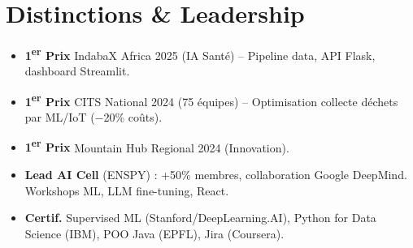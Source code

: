 \documentclass[a4paper,11pt]{article}
\begin{document}
\section{Distinctions \& Leadership}
\begin{itemize}[leftmargin=*, label=\tiny$\bullet$, nosep]
    \item \small{\textbf{1\textsuperscript{er} Prix} IndabaX Africa 2025 (IA Santé) -- Pipeline data, API Flask, dashboard Streamlit.}
    \item \small{\textbf{1\textsuperscript{er} Prix} CITS National 2024 (75 équipes) -- Optimisation collecte déchets par ML/IoT ($-$20\% coûts).}
    \item \small{\textbf{1\textsuperscript{er} Prix} Mountain Hub Regional 2024 (Innovation).}
    \item \small{\textbf{Lead AI Cell} (ENSPY) : +50\% membres, collaboration Google DeepMind. Workshops ML, LLM fine-tuning, React.}
    \item \small{\textbf{Certif.} Supervised ML (Stanford/DeepLearning.AI), Python for Data Science (IBM), POO Java (EPFL), Jira (Coursera).}
\end{itemize}
\end{document}
